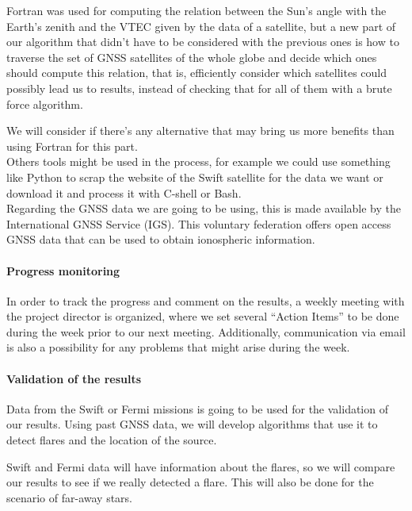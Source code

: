 Fortran was used for computing the relation between the Sun’s angle with the Earth’s zenith and the VTEC given by the data of a satellite, but a new part of our algorithm that didn’t have to be considered with the previous ones is how to traverse the set of GNSS satellites of the whole globe and decide which ones should compute this relation, that is, efficiently consider which satellites could possibly lead us to results, instead of checking that for all of them with a brute force algorithm.

We will consider if there’s any alternative that may bring us more benefits than using Fortran for this part. \\

Others tools might be used in the process, for example we could use something like Python to scrap the website of the Swift satellite for the data we want or download it and process it with C-shell or Bash.\\

Regarding the GNSS data we are going to be using, this is made available by the  International GNSS Service (IGS). This voluntary federation offers open access GNSS data that can be used to obtain ionospheric information. \cite{hernandez2009igs}

\paragraph{Progress monitoring}

In order to track the progress and comment on the results, a weekly meeting with the project director is organized, where we set several “Action Items” to be done during the week prior to our next meeting. Additionally, communication via email is also a possibility for any problems that might arise during the week.

\paragraph{Validation of the results}

Data from the Swift or Fermi missions is going to be used for the validation of our results. Using past GNSS data, we will develop algorithms that use it to detect flares and the location of the source. 

Swift and Fermi data will have information about the flares, so we will compare our results to see if we really detected a flare. This will also be done for the scenario of far-away stars.

